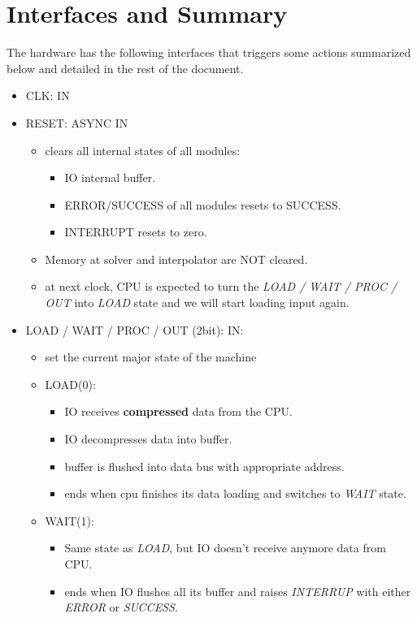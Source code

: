 \documentclass[12pt]{report}
\begin{document}
\section{Interfaces and Summary}
The hardware has the following interfaces that triggers some actions summarized below and detailed in the rest of the document.
\begin{itemize}
    \item CLK: IN
    \item RESET: ASYNC IN
    \begin{itemize}
        \item clears all internal states of all modules:
        \begin{itemize}
            \item IO internal buffer.
            \item ERROR/SUCCESS of all modules resets to SUCCESS.
            \item INTERRUPT resets to zero.
        \end{itemize}
        \item Memory at solver and interpolator are NOT cleared.
        \item at next clock, CPU is expected to turn the \emph{LOAD / WAIT / PROC / OUT} into \emph{LOAD} state and we will start loading input again.
    \end{itemize}
    \item LOAD / WAIT / PROC / OUT (2bit): IN:
    \begin{itemize}
        \item set the current major state of the machine
        \item LOAD(0):
        \begin{itemize}
            \item IO receives \textbf{compressed} data from the CPU.
            \item IO decompresses data into buffer.
            \item buffer is flushed into data bus with appropriate address.
            \item ends when cpu finishes its data loading and switches to \emph{WAIT} state.
        \end{itemize}
        \item WAIT(1):
        \begin{itemize}
            \item Same state as \emph{LOAD}, but IO doesn't receive anymore data from CPU.
            \item ends when IO flushes all its buffer and raises \emph{INTERRUP} with either \emph{ERROR} or \emph{SUCCESS}.

\end{itemize}
\end{itemize}
\end{itemize}
\end{document}
